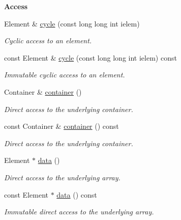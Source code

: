 \begin{Indent}{\bf Access}
\begin{DoxyCompactItemize}
Element \& \hyperlink{exceptionmagrathea_1_1SimpleHyperOctree_a6360327d03825a0987169bc158aa84d3}{cycle} (const long long int ielem)
\begin{DoxyCompactList}\small\item\em Cyclic access to an element. \end{DoxyCompactList}\item 
const Element \& \hyperlink{exceptionmagrathea_1_1SimpleHyperOctree_a3782b956adfa8f040779b349793ef6a3}{cycle} (const long long int ielem) const 
\begin{DoxyCompactList}\small\item\em Immutable cyclic access to an element. \end{DoxyCompactList}\item 
Container \& \hyperlink{exceptionmagrathea_1_1SimpleHyperOctree_a7f551eab5578bfac28efc0d21969e69a}{container} ()
\begin{DoxyCompactList}\small\item\em Direct access to the underlying container. \end{DoxyCompactList}\item 
const Container \& \hyperlink{exceptionmagrathea_1_1SimpleHyperOctree_a3b5c5fc3d468cf84877ba97eb87f8e8d}{container} () const 
\begin{DoxyCompactList}\small\item\em Direct access to the underlying container. \end{DoxyCompactList}\item 
Element $\ast$ \hyperlink{exceptionmagrathea_1_1SimpleHyperOctree_ae71845a6920f404326fdf0e763df2a7e}{data} ()
\begin{DoxyCompactList}\small\item\em Direct access to the underlying array. \end{DoxyCompactList}\item 
const Element $\ast$ \hyperlink{exceptionmagrathea_1_1SimpleHyperOctree_a50f7a9684bc3defe77d76e5c98a871b5}{data} () const 
\begin{DoxyCompactList}\small\item\em Immutable direct access to the underlying array. \end{DoxyCompactList}\end{DoxyCompactItemize}
\end{Indent}
